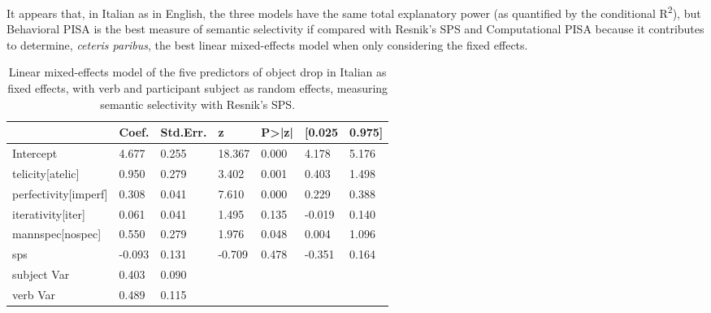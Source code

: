 It appears that, in Italian as in English, the three models have the same total explanatory power (as quantified by the conditional R\textsuperscript{2}), but Behavioral PISA is the best measure of semantic selectivity if compared with Resnik's SPS and Computational PISA because it contributes to determine, \textit{ceteris paribus}, the best linear mixed-effects model when only considering the fixed effects.

\begin{table}[htb] %
\caption{Linear mixed-effects model of the five predictors of object drop in Italian as fixed effects, with verb and participant subject as random effects, measuring semantic selectivity with Resnik's SPS.}
\begin{tabular}{l|llllll}
                         & Coef. & Std.Err. & z      & P\textgreater{}|z| & {[}0.025 & 0.975{]} \\
\hline                         
Intercept                & 4.677  & 0.255    & 18.367 & 0.000              & 4.178    & 5.176    \\
telicity{[}atelic{]}     & 0.950  & 0.279    & 3.402  & 0.001              & 0.403    & 1.498    \\
perfectivity{[}imperf{]} & 0.308  & 0.041    & 7.610  & 0.000              & 0.229    & 0.388    \\
iterativity{[}iter{]}    & 0.061  & 0.041    & 1.495  & 0.135              & -0.019   & 0.140    \\
mannspec{[}nospec{]}     & 0.550  & 0.279    & 1.976  & 0.048              & 0.004    & 1.096    \\
sps                      & -0.093 & 0.131    & -0.709 & 0.478              & -0.351   & 0.164    \\
subject Var              & 0.403  & 0.090     &        &                    &          &          \\
verb Var                 & 0.489  & 0.115    &        &                    &          &         
\end{tabular}
\end{table}

